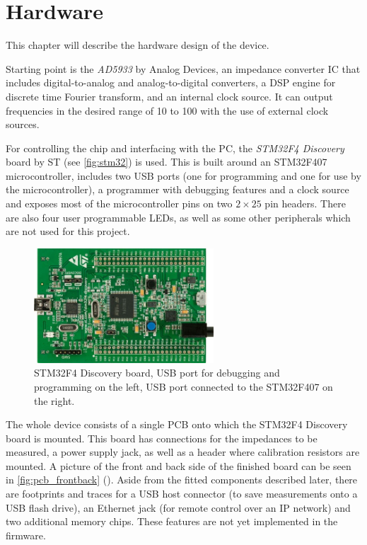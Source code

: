 \chapter{Hardware} \label{sec:hardware}

This chapter will describe the hardware design of the device.

Starting point is the \emph{AD5933} by Analog Devices, an impedance converter IC that includes digital-to-analog and
analog-to-digital converters, a DSP engine for discrete time Fourier transform, and an internal clock source. It can
output frequencies in the desired range of \unit{10}{\hertz} to \unit{100}{\kilo\hertz} with the use of external
clock sources.

For controlling the chip and interfacing with the PC, the \emph{STM32F4 Discovery} board by ST (see \autoref{fig:stm32})
is used. This is built around an STM32F407 microcontroller, includes two USB ports (one for programming and one for use
by the microcontroller), a programmer with debugging features and a clock source and exposes most of the microcontroller
pins on two $ 2 \times 25 $ pin headers. There are also four user programmable LEDs, as well as some other peripherals
which are not used for this project.

\begin{figure}[htpb]
  \centering
    \includegraphics[width=0.6\textwidth]{bilder/stm32.jpg}
  \caption{STM32F4 Discovery board, USB port for debugging and programming on the left, USB port connected to the
    STM32F407 on the right.}
  \label{fig:stm32}
\end{figure}

The whole device consists of a single PCB onto which the STM32F4 Discovery board is mounted. This board has connections
for the impedances to be measured, a power supply jack, as well as a header where calibration resistors are mounted.
A picture of the front and back side of the finished board can be seen in \autoref{fig:pcb_frontback}
(). Aside from the fitted components described later, there are footprints and traces
for a USB host connector (to save measurements onto a USB flash drive), an Ethernet jack (for remote control over
an IP network) and two additional memory chips. These features are not yet implemented in the firmware.

